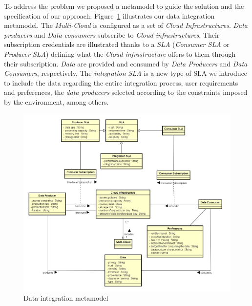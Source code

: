 To address the problem we proposed a metamodel to guide the solution and the specification of our approach. Figure~\ref{fig:scenario} illustrates our data integration metamodel.
The \textsl{Multi-Cloud} is configured as a set of \textsl{Cloud Infrastructures}. \textsl{Data producers} and \textsl{Data consumers} subscribe to \textsl{Cloud infrastructures}. 
Their subscription credentials are illustrated thanks to a \textsl{SLA} (\textsl{Consumer SLA} or \textsl{Producer SLA}) defining what the \textsl{Cloud infrastructure} offers to them through their subscription. 
\textsl{Data} are provided and consumed by \textsl{Data Producers} and \textsl{Data Consumers}, respectively. The \textsl{integration SLA} is a new type of SLA we introduce  to include the data regarding the entire integration process, user requirements and preferences, the \textsl{data producers} selected according to the constraints imposed by the environment, among others.

\begin{figure}[th!]
\center
\includegraphics[scale=0.50]{metamodel.pdf}
\caption{Data integration metamodel}\label{fig:scenario}
\end{figure}


